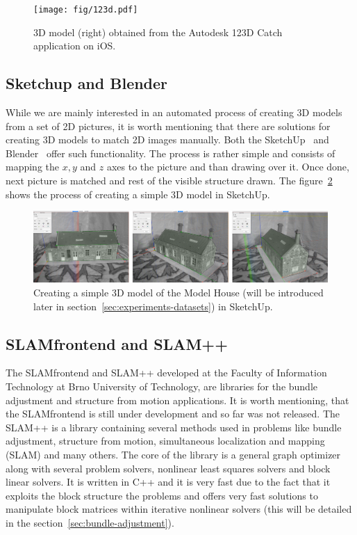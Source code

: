 \begin{figure}[ht]
	\begin{center}
		\texttt{[image: fig/123d.pdf]}
	\end{center}
	\caption{3D model (right) obtained from the Autodesk 123D Catch application on iOS.}
	\label{fig:openvmg}
\end{figure}

\subsection*{Sketchup and Blender}
While we are mainly interested in an automated process of creating 3D models from a set of 2D pictures, it is worth mentioning that there are solutions for creating 3D models to match 2D images manually. Both the SketchUp~\cite{sketchup, sketchup-modeling} and Blender~\cite{www:blender} offer such functionality. The process is rather simple and consists of mapping the $x, y$ and $z$ axes to the picture and than drawing over it. Once done, next picture is matched and rest of the visible structure drawn. The figure~\ref{fig:sketchup} shows the process of creating a simple 3D model in SketchUp.

\begin{figure}[ht]
	\begin{center}
		\includegraphics[keepaspectratio,width=\textwidth]{fig/sketchup_modelhouse.pdf}
	\end{center}
	\caption{Creating a simple 3D model of the Model House (will be introduced later in section~\ref{sec:experiments-datasets}) in SketchUp.}
	\label{fig:sketchup}
\end{figure}

\subsection*{SLAM\textunderscore frontend and SLAM++}
The SLAM\textunderscore frontend  and SLAM++ developed at the Faculty of Information Technology at Brno University of Technology, are libraries for the bundle adjustment and structure from motion applications. It is worth mentioning, that the SLAM\textunderscore frontend is still under development and so far was not released. The SLAM++ is a library containing several methods used in problems like bundle adjustment, structure from motion, simultaneous localization and mapping (SLAM) and many others. The core of the library is a general graph optimizer along with several problem solvers, nonlinear least squares solvers and block linear solvers. It is written in C++ and it is very fast due to the fact that it exploits the block structure the problems and offers very fast solutions to manipulate block matrices within iterative nonlinear solvers (this will be detailed in the section~\ref{sec:bundle-adjustment}).

